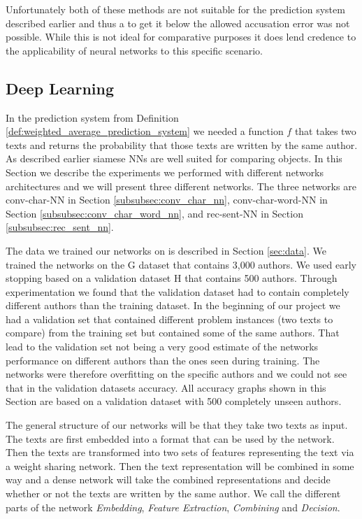 Unfortunately both of these methods are not suitable for the prediction system
described earlier and thus a to get it below the allowed accusation error was
not possible. While this is not ideal for comparative purposes it does lend
credence to the applicability of neural networks to this specific scenario.


\subsection{Deep Learning}

In the prediction system from Definition
\ref{def:weighted_average_prediction_system} we needed a function $f$ that
takes two texts and returns the probability that those texts are written
by the same author. As described earlier siamese \gls{NN}s are well
suited for comparing objects. In this Section we describe the experiments
we performed with different networks architectures and we will present
three different networks. The three networks are \gls{conv-char-NN} in
Section \ref{subsubsec:conv_char_nn}, \gls{conv-char-word-NN} in Section
\ref{subsubsec:conv_char_word_nn}, and \gls{rec-sent-NN} in Section
\ref{subsubsec:rec_sent_nn}.

The data we trained our networks on is described in Section \ref{sec:data}. We
trained the networks on the \gls{G} dataset that contains 3,000 authors. We used
early stopping based on a validation dataset \gls{H} that contains 500 authors.
Through experimentation we found that the validation dataset had to contain
completely different authors than the training dataset. In the beginning of
our project we had a validation set that contained different problem instances
(two texts to compare) from the training set but contained some of the same
authors. That lead to the validation set not being a very good estimate of the
networks performance on different authors than the ones seen during training.
The networks were therefore overfitting on the specific authors and we could not
see that in the validation datasets accuracy. All accuracy graphs shown in this
Section are based on a validation dataset with 500 completely unseen authors.

The general structure of our networks will be that they take two texts as input.
The texts are first embedded into a format that can be used by the network.
Then the texts are transformed into two sets of features representing the text
via a weight sharing network. Then the text representation will be combined
in some way and a dense network will take the combined representations and
decide whether or not the texts are written by the same author. We call the
different parts of the network \textit{Embedding}, \textit{Feature Extraction},
\textit{Combining} and \textit{Decision}.

